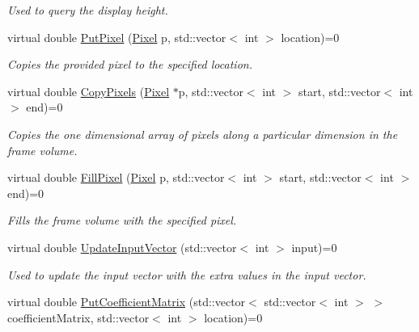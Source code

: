 \begin{DoxyCompactItemize}
\begin{DoxyCompactList}\small\item\em Used to query the display height. \item\end{DoxyCompactList}\item 
virtual double \hyperlink{classnddi_1_1_n_dimensional_display_interface_a93606fb46a02eff9ad8fb556d965b0f8}{PutPixel} (\hyperlink{unionnddi_1_1_pixel}{Pixel} p, std::vector$<$ int $>$ location)=0
\begin{DoxyCompactList}\small\item\em Copies the provided pixel to the specified location. \item\end{DoxyCompactList}\item 
virtual double \hyperlink{classnddi_1_1_n_dimensional_display_interface_a070d19f4f735b739fe1f39a5db2d3ec3}{CopyPixels} (\hyperlink{unionnddi_1_1_pixel}{Pixel} $\ast$p, std::vector$<$ int $>$ start, std::vector$<$ int $>$ end)=0
\begin{DoxyCompactList}\small\item\em Copies the one dimensional array of pixels along a particular dimension in the frame volume. \item\end{DoxyCompactList}\item 
virtual double \hyperlink{classnddi_1_1_n_dimensional_display_interface_afda2b784a44f4b34ad911dfcdec98fe6}{FillPixel} (\hyperlink{unionnddi_1_1_pixel}{Pixel} p, std::vector$<$ int $>$ start, std::vector$<$ int $>$ end)=0
\begin{DoxyCompactList}\small\item\em Fills the frame volume with the specified pixel. \item\end{DoxyCompactList}\item 
virtual double \hyperlink{classnddi_1_1_n_dimensional_display_interface_ad7ce868f6a77d5c75eb64a8a4f4244c0}{UpdateInputVector} (std::vector$<$ int $>$ input)=0
\begin{DoxyCompactList}\small\item\em Used to update the input vector with the extra values in the input vector. \item\end{DoxyCompactList}\item 
virtual double \hyperlink{classnddi_1_1_n_dimensional_display_interface_a61a20de40073a399e335d35fb0adb0cb}{PutCoefficientMatrix} (std::vector$<$ std::vector$<$ int $>$ $>$ coefficientMatrix, std::vector$<$ int $>$ location)=0

\end{DoxyCompactItemize}
